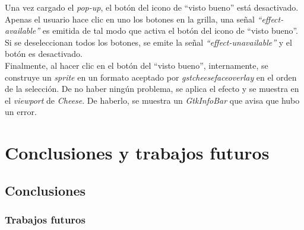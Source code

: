\documentclass[a4paper,openright,12pt]{report}
\begin{document}
Una vez cargado el \textit{pop-up}, el botón del icono de ``visto bueno'' está
desactivado. Apenas el usuario hace clic en uno los botones en la grilla, una
señal \textit{``effect-available''} es emitida de tal modo que activa el botón
del icono de ``visto bueno''. Si se deseleccionan todos los botones, se emite la
señal \textit{``effect-unavailable''} y el botón es desactivado.\\

Finalmente, al hacer clic en el botón del ``visto bueno'', internamente,
se construye un \textit{sprite} en un formato aceptado por
\textit{gstcheesefaceoverlay} en el orden de la selección. De no haber ningún
problema, se aplica el efecto y se muestra en el \textit{viewport} de \textit{Cheese}.
De haberlo, se muestra un \textit{GtkInfoBar} que avisa que hubo un error.


\chapter{Conclusiones y trabajos futuros}
\section{Conclusiones}
\subsection{Trabajos futuros}


{}
\end{document}
